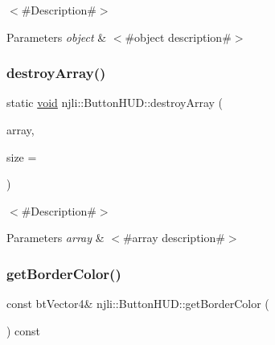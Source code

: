 $<$\#\+Description\#$>$


\begin{DoxyParams}{Parameters}
{\em object} & $<$\#object description\#$>$ \\
\hline
\end{DoxyParams}
\mbox{\label{classnjli_1_1_button_h_u_d_a493b9dd71eb34cfee436005674a92f12}} 
\subsubsection{\texorpdfstring{destroy\+Array()}{destroyArray()}}
{\footnotesize\ttfamily static \mbox{\hyperlink{_thread_8h_af1e856da2e658414cb2456cb6f7ebc66}{void}} njli\+::\+Button\+H\+U\+D\+::destroy\+Array (\begin{DoxyParamCaption}\item[{\mbox{\hyperlink{classnjli_1_1_button_h_u_d}{Button\+H\+UD}} $\ast$$\ast$}]{array,  }\item[{const \mbox{\hyperlink{_util_8h_a10e94b422ef0c20dcdec20d31a1f5049}{u32}}}]{size = {} }\end{DoxyParamCaption})\hspace{0.3cm}{\ttfamily [static]}}

$<$\#\+Description\#$>$


\begin{DoxyParams}{Parameters}
{\em array} & $<$\#array description\#$>$ \\
\hline
\end{DoxyParams}
\mbox{\label{classnjli_1_1_button_h_u_d_a1c85e36e3bee7d12f8af5b2b25cf660a}} 
\subsubsection{\texorpdfstring{get\+Border\+Color()}{getBorderColor()}}
{\footnotesize\ttfamily const bt\+Vector4\& njli\+::\+Button\+H\+U\+D\+::get\+Border\+Color (\begin{DoxyParamCaption}{ }\end{DoxyParamCaption}) const}

